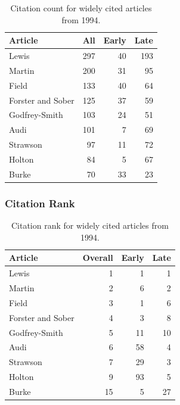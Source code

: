 \documentclass[
  10pt,
  letterpaper,
  DIV=11,
  numbers=noendperiod,
  twoside]{scrartcl}
\begin{document}
\begin{longtable}[]{@{}lrrr@{}}

\caption{\label{tbl-citation-count-1994}Citation count for widely cited
articles from 1994.}

\tabularnewline

\toprule\noalign{}
Article & All & Early & Late \\
\midrule\noalign{}
\endhead
\bottomrule\noalign{}
\endlastfoot
Lewis & 297 & 40 & 193 \\
Martin & 200 & 31 & 95 \\
Field & 133 & 40 & 64 \\
Forster and Sober & 125 & 37 & 59 \\
Godfrey-Smith & 103 & 24 & 51 \\
Audi & 101 & 7 & 69 \\
Strawson & 97 & 11 & 72 \\
Holton & 84 & 5 & 67 \\
Burke & 70 & 33 & 23 \\

\end{longtable}

\subsubsection*{Citation Rank}\label{sec-rank-1994}

\begin{longtable}[]{@{}lrrr@{}}

\caption{\label{tbl-citation-rank-1994}Citation rank for widely cited
articles from 1994.}

\tabularnewline

\toprule\noalign{}
Article & Overall & Early & Late \\
\midrule\noalign{}
\endhead
\bottomrule\noalign{}
\endlastfoot
Lewis & 1 & 1 & 1 \\
Martin & 2 & 6 & 2 \\
Field & 3 & 1 & 6 \\
Forster and Sober & 4 & 3 & 8 \\
Godfrey-Smith & 5 & 11 & 10 \\
Audi & 6 & 58 & 4 \\
Strawson & 7 & 29 & 3 \\
Holton & 9 & 93 & 5 \\
Burke & 15 & 5 & 27 \\

\end{longtable}
\end{document}
